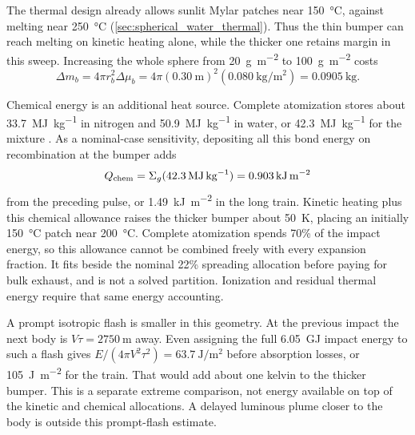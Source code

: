 \documentclass{article}
\begin{document}
The thermal design already allows sunlit Mylar patches near \SI{150}{\celsius}, against melting near \SI{250}{\celsius} (\autoref{sec:spherical_water_thermal}). Thus the thin bumper can reach melting on kinetic heating alone, while the thicker one retains margin in this sweep. Increasing the whole sphere from \SI{20}{\gram\per\square\meter} to \SI{100}{\gram\per\square\meter} costs
\begin{equation}
\Delta m_b=4\pi r_b^2\Delta\mu_b
=4\pi(\SI{0.30}{\meter})^2(\SI{0.080}{\kilogram\per\square\meter})
=\SI{0.0905}{\kilogram}.
\end{equation}

Chemical energy is an additional heat source. Complete atomization stores about \SI{33.7}{\mega\joule\per\kilogram} in nitrogen and \SI{50.9}{\mega\joule\per\kilogram} in water, or \SI{42.3}{\mega\joule\per\kilogram} for the mixture \cite{crc_handbook}. As a nominal-case sensitivity, depositing all this bond energy on recombination at the bumper adds
\begin{equation}
Q_{\rm chem}=\Sigma_g(\SI{42.3}{\mega\joule\per\kilogram})
=\SI{0.903}{\kilo\joule\per\square\meter}
\end{equation}
from the preceding pulse, or \SI{1.49}{\kilo\joule\per\square\meter} in the long train. Kinetic heating plus this chemical allowance raises the thicker bumper about \SI{50}{\kelvin}, placing an initially \SI{150}{\celsius} patch near \SI{200}{\celsius}. Complete atomization spends 70\% of the impact energy, so this allowance cannot be combined freely with every expansion fraction. It fits beside the nominal 22\% spreading allocation before paying for bulk exhaust, and is not a solved partition. Ionization and residual thermal energy require that same energy accounting.

A prompt isotropic flash is smaller in this geometry. At the previous impact the next body is $V\tau=\SI{2750}{\meter}$ away. Even assigning the full \SI{6.05}{\giga\joule} impact energy to such a flash gives $E/(4\pi V^2\tau^2)=\SI{63.7}{\joule\per\square\meter}$ before absorption losses, or \SI{105}{\joule\per\square\meter} for the train. That would add about one kelvin to the thicker bumper. This is a separate extreme comparison, not energy available on top of the kinetic and chemical allocations. A delayed luminous plume closer to the body is outside this prompt-flash estimate.
\end{document}
